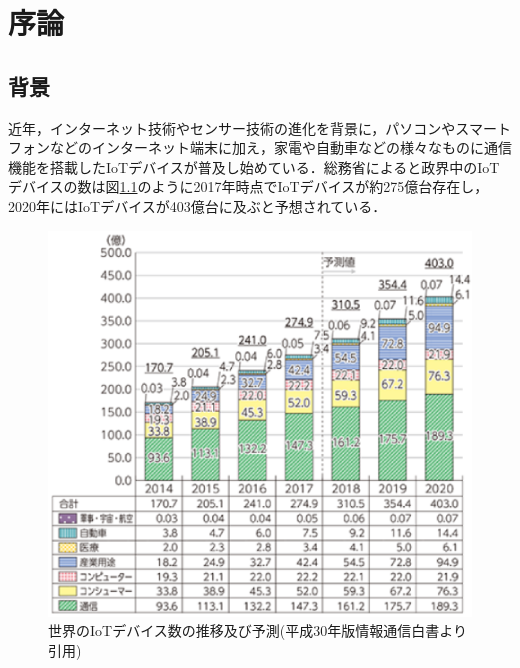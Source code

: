 \chapter{序論} %


\section{背景} %


近年，インターネット技術やセンサー技術の進化を背景に，パソコンやスマートフォンなどのインターネット端末に加え，家電や自動車などの様々なものに通信機能を搭載したIoTデバイスが普及し始めている．総務省によると政界中のIoTデバイスの数は図\ref{fig:IoT}のように2017年時点でIoTデバイスが約275億台存在し，2020年にはIoTデバイスが403億台に及ぶと予想されている\cite{IoT}．
 \begin{figure}[hb]
 \centering
    \includegraphics{figures/IoT_device.eps}
    \caption{世界のIoTデバイス数の推移及び予測(平成30年版情報通信白書より引用)}
 \label{fig:IoT}
 \end{figure}
 \clearpage

